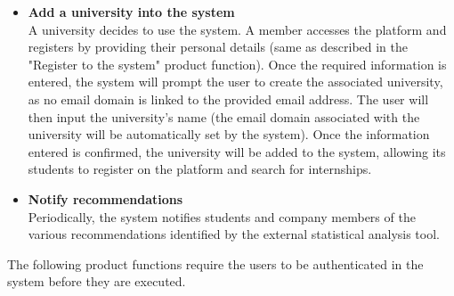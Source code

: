 \begin{itemize}
      \item \textbf{Add a university into the system} \\
      A university decides to use the system. A member accesses the platform and registers by providing their personal details (same as described in the "Register to the system" product function). Once the required information is entered, the system will prompt the user to create the associated university, as no email domain is linked to the provided email address. The user will then input the university's name (the email domain associated with the university will be automatically set by the system). Once the information entered is confirmed, the university will be added to the system, allowing its students to register on the platform and search for internships.

      \item \textbf{Notify recommendations} \\
      Periodically, the system notifies students and company members of the various recommendations identified by the external statistical analysis tool.
\end{itemize}
\newpage
\noindent The following product functions require the users to be authenticated in the system before they are executed.

